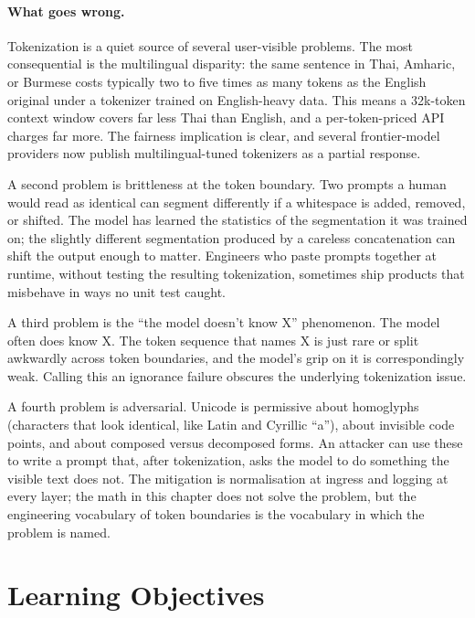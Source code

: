 \paragraph{What goes wrong.} Tokenization is a quiet source of
several user-visible problems. The most consequential is the
multilingual disparity: the same sentence in Thai, Amharic, or
Burmese costs typically two to five times as many tokens as the
English original under a tokenizer trained on English-heavy data.
This means a 32k-token context window covers far less Thai than
English, and a per-token-priced API charges far more. The fairness
implication is clear, and several frontier-model providers now
publish multilingual-tuned tokenizers as a partial response.

A second problem is brittleness at the token boundary. Two prompts
a human would read as identical can segment differently if a
whitespace is added, removed, or shifted. The model has learned
the statistics of the segmentation it was trained on; the
slightly different segmentation produced by a careless
concatenation can shift the output enough to matter. Engineers
who paste prompts together at runtime, without testing the
resulting tokenization, sometimes ship products that misbehave in
ways no unit test caught.

A third problem is the ``the model doesn't know X'' phenomenon.
The model often does know X. The token sequence that names X is
just rare or split awkwardly across token boundaries, and the
model's grip on it is correspondingly weak. Calling this an
ignorance failure obscures the underlying tokenization issue.

A fourth problem is adversarial. Unicode is permissive about
homoglyphs (characters that look identical, like Latin and
Cyrillic ``a''), about invisible code points, and about composed
versus decomposed forms. An attacker can use these to write a
prompt that, after tokenization, asks the model to do something
the visible text does not. The mitigation is normalisation at
ingress and logging at every layer; the math in this chapter does
not solve the problem, but the engineering vocabulary of token
boundaries is the vocabulary in which the problem is named.

\section{Learning Objectives}

